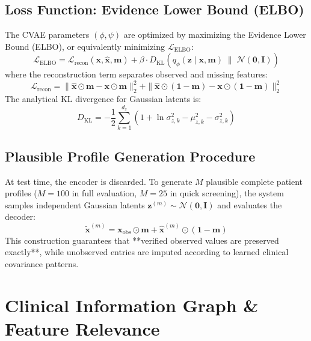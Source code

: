 \documentclass[11pt,a4paper]{report}
\begin{document}
\section{Loss Function: Evidence Lower Bound (ELBO)}
The CVAE parameters $(\phi, \psi)$ are optimized by maximizing the Evidence Lower Bound (ELBO), or equivalently minimizing $\mathcal{L}_{\text{ELBO}}$:
\begin{equation}
  \mathcal{L}_{\text{ELBO}} = \mathcal{L}_{\text{recon}}(\mathbf{x}, \hat{\mathbf{x}}, \mathbf{m}) + \beta \cdot D_{\text{KL}}\left(q_\phi(\mathbf{z} \mid \mathbf{x}, \mathbf{m}) \;\big\|\; \mathcal{N}(\mathbf{0}, \mathbf{I})\right)
\end{equation}
where the reconstruction term separates observed and missing features:
\begin{equation}
  \mathcal{L}_{\text{recon}} = \|\hat{\mathbf{x}} \odot \mathbf{m} - \mathbf{x} \odot \mathbf{m}\|_2^2 + \|\hat{\mathbf{x}} \odot (\mathbf{1} - \mathbf{m}) - \mathbf{x} \odot (\mathbf{1} - \mathbf{m})\|_2^2
\end{equation}
The analytical KL divergence for Gaussian latents is:
\begin{equation}
  D_{\text{KL}} = -\frac{1}{2} \sum_{k=1}^{d_z} \left(1 + \ln \sigma_{z,k}^2 - \mu_{z,k}^2 - \sigma_{z,k}^2\right)
\end{equation}

\section{Plausible Profile Generation Procedure}
At test time, the encoder is discarded. To generate $M$ plausible complete patient profiles ($M=100$ in full evaluation, $M=25$ in quick screening), the system samples independent Gaussian latents $\mathbf{z}^{(m)} \sim \mathcal{N}(\mathbf{0}, \mathbf{I})$ and evaluates the decoder:
\begin{equation}
  \tilde{\mathbf{x}}^{(m)} = \mathbf{x}_{\text{obs}} \odot \mathbf{m} + \hat{\mathbf{x}}^{(m)} \odot (\mathbf{1} - \mathbf{m})
\end{equation}
This construction guarantees that **verified observed values are preserved exactly**, while unobserved entries are imputed according to learned clinical covariance patterns.

\chapter{Clinical Information Graph \& Feature Relevance}
\end{document}
